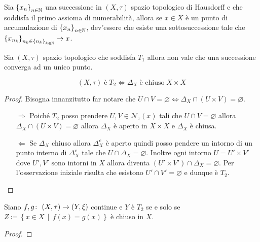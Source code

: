 \begin{theorem}
	Sia $\left\{x_n\right\}_{n\in \mathbb{N}}$ una successione in $(X,\tau)$ spazio topologico di Hausdorff e che soddisfa il primo assioma di numerabilità, allora se $x \in X$ è un punto di accumulazione di $\left\{x_n\right\}_{n\in \mathbb{N}}$, dev'essere che esiste una sottosuccessione tale che $\left\{x_{n_k}\right\}_{n_k \in \left\{n_k\right\}_{k \in \mathbb{N}}} \rightarrow x$. 
\end{theorem}

\begin{remark}
	Sia $(X, \tau)$ spazio topologico che soddisfa $T_1$ allora non vale che una successione converga ad un unico punto.
\end{remark}

\begin{theorem}
	\begin{equation*}
	(X, \tau) \; \text{è} \; T_2 \Leftrightarrow \Delta_{X} \; \text{è chiuso} \; X \times X
	\end{equation*}
\end{theorem} 
\begin{proof}
	Bisogna innanzitutto far notare che $U \cap V = \varnothing \Leftrightarrow \Delta_X \cap (U \times V) = \varnothing$.
	\begin{enumerate}
		\item[$\Rightarrow$] Poiché $T_2$ posso prendere $U, V \in \mathcal{N}_\tau(x)$ tali che $U \cap V = \varnothing$ allora $\Delta_X \cap (U \times V) = \varnothing$ allora $\Delta_X$ è aperto in $X\times X$ e $\Delta_X$ è chiusa. 
		\item[$\Leftarrow$] Se $\Delta_X$ chiuso   allora $\Delta^c_X$ è aperto quindi posso pendere un intorno di un punto interno di $\Delta^c_X$ tale che $U \cap \Delta_X = \varnothing$. Inoltre ogni intorno $U = U' \times V'$ dove $U', V'$ sono intorni in $X$ allora diventa $(U' \times V') \cap \Delta_X = \varnothing$. Per l'osservazione iniziale risulta che esistono $U' \cap V' = \varnothing$ e dunque è $T_2$.
	\end{enumerate}
\end{proof}

\begin{theorem}
	Siano $f,g \colon\ (X,\tau) \rightarrow (Y,\xi)$ continue e $Y$ è $T_2$ se e solo se $Z \coloneqq \left\{x \in X \,\middle|\, f(x) = g(x) \right\}$ è chiuso in $X$.
\end{theorem}
\begin{proof}
\end{proof}

